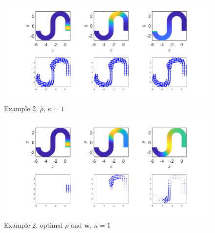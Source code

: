 \documentclass[11pt, a4paper]{article}
\theoremstyle{definition}
\newcommand{\w}{\mathbf{w}}
\begin{document}
\begin{figure}[h]
	\centering
	\includegraphics[scale=0.3]{FW21.png}
	\caption{Example 2, $\widehat \rho$, $\kappa = 1$} 
	\label{FEx2c}
\end{figure}
\begin{figure}[h]
	\centering
	\includegraphics[scale=0.3]{Opt21.png}
	\caption{Example 2, optimal $\rho$ and $\w$, $\kappa = 1$} 
	\label{FEx2d}
\end{figure}







	
\end{document}
